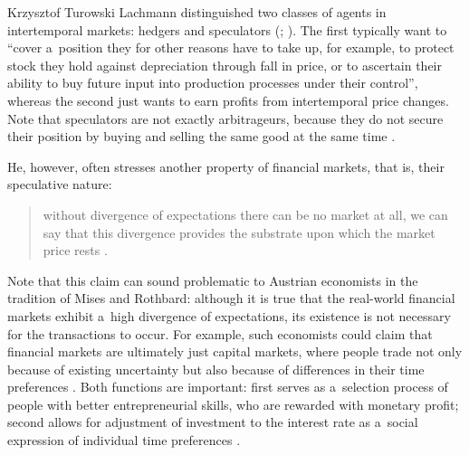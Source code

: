 \begin{artengenv}{Krzysztof Turowski}
Lachmann distinguished two classes of agents in intertemporal markets: hedgers and speculators (\cite[10]{lachmann1986market}; \citeyear[264--265]{lachmann-speculative-markets}). The first typically want to ``cover a~position they for other reasons have to take up, for example, to protect stock they hold against depreciation through fall in price, or to ascertain their ability to buy future input into production processes under their control'', whereas the second just wants to earn profits from intertemporal price changes.
Note that speculators are not exactly arbitrageurs, because they do not secure their position by buying and selling the same good at the same time \parencite[10]{lachmann1986market}.

He, however, often stresses another property of financial markets, that is, their speculative nature:
\begin{quote}
without divergence of expectations there can be no market at all, we can say that this divergence provides the substrate upon which the market price rests \parencite[161]{lachmann-model}.
\end{quote}
Note that this claim can sound problematic to Austrian economists in the tradition of Mises and Rothbard: although it is true that the real-world financial markets exhibit a~high divergence of expectations, its existence is not necessary for the transactions to occur. For example, such economists could claim that financial markets are ultimately just capital markets, where people trade not only because of existing uncertainty but also because of differences in their time preferences \parencite[376--378]{rothbard-mes}. Both functions are important: first serves as a~selection process of people with better entrepreneurial skills, who are rewarded with monetary profit; second allows for adjustment of investment to the interest rate as a~social expression of individual time preferences \parencite{klein-entrepreneurship}.


\end{artengenv}
